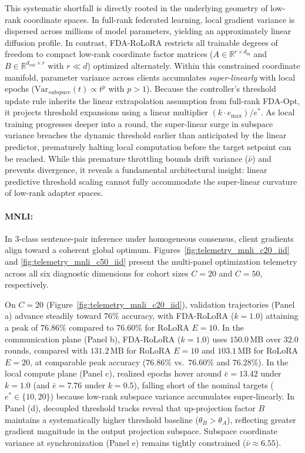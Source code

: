 This systematic shortfall is directly rooted in the underlying geometry of low-rank coordinate spaces. In full-rank federated learning, local gradient variance is dispersed across millions of model parameters, yielding an approximately linear diffusion profile. In contrast, FDA-RoLoRA restricts all trainable degrees of freedom to compact low-rank coordinate factor matrices ($A \in \mathbb{R}^{r \times d_{\text{in}}}$ and $B \in \mathbb{R}^{d_{\text{out}} \times r}$ with $r \ll d$) optimized alternately. Within this constrained coordinate manifold, parameter variance across clients accumulates \emph{super-linearly} with local epochs ($\text{Var}_{subspace}(t) \propto t^p$ with $p > 1$). Because the controller's threshold update rule inherits the linear extrapolation assumption from full-rank FDA-Opt, it projects threshold expansions using a linear multiplier $(k \cdot e_{\max})/e^*$. As local training progresses deeper into a round, the super-linear surge in subspace variance breaches the dynamic threshold earlier than anticipated by the linear predictor, prematurely halting local computation before the target setpoint can be reached. While this premature throttling bounds drift variance ($\bar{\nu}$) and prevents divergence, it reveals a fundamental architectural insight: linear predictive threshold scaling cannot fully accommodate the super-linear curvature of low-rank adapter spaces.

\paragraph{MNLI:}
In 3-class sentence-pair inference under homogeneous consensus, client gradients align toward a coherent global optimum. Figures~\ref{fig:telemetry_mnli_c20_iid} and \ref{fig:telemetry_mnli_c50_iid} present the multi-panel optimization telemetry across all six diagnostic dimensions for cohort sizes $C=20$ and $C=50$, respectively. 

On $C=20$ (Figure~\ref{fig:telemetry_mnli_c20_iid}), validation trajectories (Panel a) advance steadily toward $76\%$ accuracy, with FDA-RoLoRA ($k=1.0$) attaining a peak of $\mathbf{76.86\%}$ compared to $76.60\%$ for RoLoRA $E=10$. In the communication plane (Panel b), FDA-RoLoRA ($k=1.0$) uses $150.0\,\text{MB}$ over $32.0$ rounds, compared with $131.2\,\text{MB}$ for RoLoRA $E=10$ and $103.1\,\text{MB}$ for RoLoRA $E=20$, at comparable peak accuracy ($76.86\%$ vs.\ $76.60\%$ and $76.28\%$). In the local compute plane (Panel c), realized epochs hover around $\bar{e} = 13.42$ under $k=1.0$ (and $\bar{e} = 7.76$ under $k=0.5$), falling short of the nominal targets ($e^* \in \{10, 20\}$) because low-rank subspace variance accumulates super-linearly. In Panel (d), decoupled threshold tracks reveal that up-projection factor $B$ maintains a systematically higher threshold baseline ($\theta_B > \theta_A$), reflecting greater gradient magnitude in the output projection subspace. Subspace coordinate variance at synchronization (Panel e) remains tightly constrained ($\bar{\nu} \approx 6.55$).

